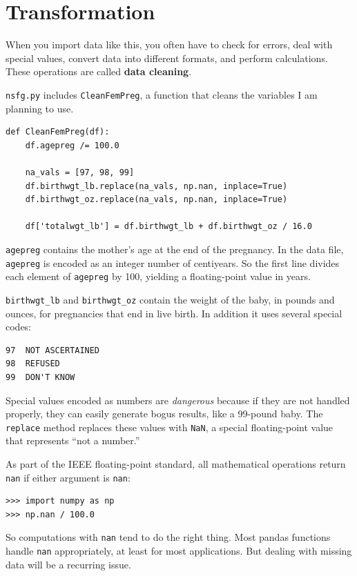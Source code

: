 \documentclass[12pt]{book}
\begin{document}
\section{Transformation}
\label{cleaning}

When you import data like this, you often have to check for errors,
deal with special values, convert data into different formats, and
perform calculations.  These operations are called {\bf data cleaning}.

{\tt nsfg.py} includes {\tt CleanFemPreg}, a function that cleans
the variables I am planning to use.

\begin{verbatim}
def CleanFemPreg(df):
    df.agepreg /= 100.0

    na_vals = [97, 98, 99]
    df.birthwgt_lb.replace(na_vals, np.nan, inplace=True)
    df.birthwgt_oz.replace(na_vals, np.nan, inplace=True)

    df['totalwgt_lb'] = df.birthwgt_lb + df.birthwgt_oz / 16.0    
\end{verbatim}

{\tt agepreg} contains the mother's age at the end of the
pregnancy.  In the data file, {\tt agepreg} is encoded as an integer
number of centiyears.  So the first line divides each element
of {\tt agepreg} by 100, yielding a floating-point value in
years.

\verb"birthwgt_lb" and \verb"birthwgt_oz" contain the weight of the
baby, in pounds and ounces, for pregnancies that end in live birth.
In addition it uses several special codes:

\begin{verbatim}
97	NOT ASCERTAINED
98	REFUSED	 
99	DON'T KNOW
\end{verbatim}

Special values encoded as numbers are {\em dangerous} because if they
are not handled properly, they can easily generate bogus results, like
a 99-pound baby.  The {\tt replace} method replaces these values with
{\tt NaN}, a special floating-point value that represents ``not a
number.''

As part of the IEEE floating-point standard, all mathematical
operations return {\tt nan} if either argument is {\tt nan}:

\begin{verbatim}
>>> import numpy as np
>>> np.nan / 100.0
\end{verbatim}

So computations with {\tt nan} tend to do the right thing.  Most
pandas functions handle {\tt nan} appropriately, at least for most
applications.  But dealing with missing data will be a recurring
issue.
\end{document}

